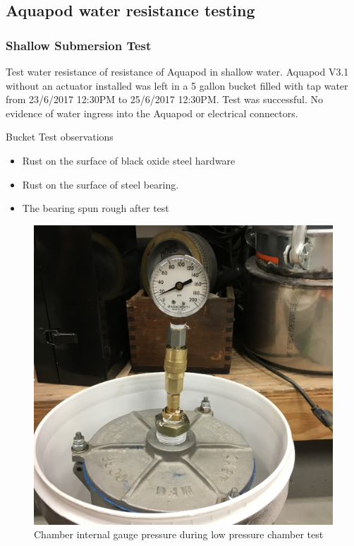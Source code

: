 \subsection{Aquapod water resistance testing}


\subsubsection{Shallow Submersion Test}
Test water resistance of resistance of Aquapod in shallow water.
Aquapod V3.1 without an actuator installed was left in a 5 gallon bucket filled with tap water from 23/6/2017 12:30PM to 25/6/2017 12:30PM. 
Test was successful. No evidence of water ingress into the Aquapod or electrical connectors. 

Bucket Test observations
\begin{itemize}
    \item Rust on the surface of black oxide steel hardware
    
    \item Rust on the surface of steel bearing. 

    \item The bearing spun rough after test

\end{itemize}

\begin{figure}[h]
\centering
\includegraphics[width=1.0\columnwidth]{./img/aquaPod-test-two-pressureCheck.JPG}
\caption{Chamber internal gauge pressure during low pressure chamber test}
\label{fig:test two pressure check}
\end{figure}


